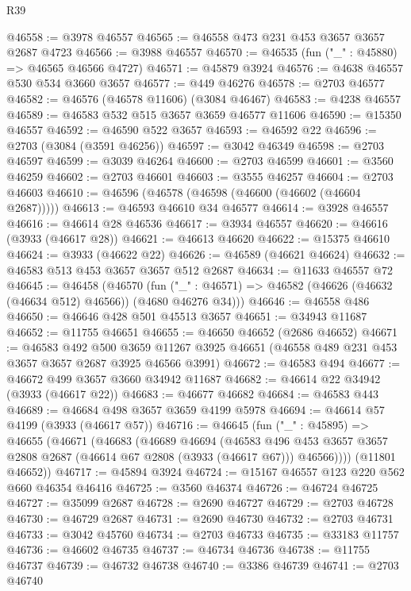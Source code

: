 \begin{lexlean}{R39}
\begin{coremodule}
@46558 := @3978 @46557
@46565 := @46558 @473 @231 @453 @3657 @3657 @2687 @4723
@46566 := @3988 @46557
@46570 := @46535 (fun ("_" : @45880) => @46565 @46566 @4727)
@46571 := @45879 @3924
@46576 := @4638 @46557 @530 @534 @3660 @3657
@46577 := @449 @46276
@46578 := @2703 @46577
@46582 := @46576 (@46578 @11606) (@3084 @46467)
@46583 := @4238 @46557
@46589 := @46583 @532 @515 @3657 @3659 @46577 @11606
@46590 := @15350 @46557
@46592 := @46590 @522 @3657
@46593 := @46592 @22
@46596 := @2703 (@3084 (@3591 @46256))
@46597 := @3042 @46349
@46598 := @2703 @46597
@46599 := @3039 @46264
@46600 := @2703 @46599
@46601 := @3560 @46259
@46602 := @2703 @46601
@46603 := @3555 @46257
@46604 := @2703 @46603
@46610 := @46596 (@46578 (@46598 (@46600 (@46602 (@46604 @2687)))))
@46613 := @46593 @46610 @34 @46577
@46614 := @3928 @46557
@46616 := @46614 @28 @46536
@46617 := @3934 @46557
@46620 := @46616 (@3933 (@46617 @28))
@46621 := @46613 @46620
@46622 := @15375 @46610
@46624 := @3933 (@46622 @22)
@46626 := @46589 (@46621 @46624)
@46632 := @46583 @513 @453 @3657 @3657 @512 @2687
@46634 := @11633 @46557 @72
@46645 := @46458
    (@46570
      (fun ("_" : @46571) => @46582 (@46626 (@46632 (@46634 @512) @46566)) (@4680 @46276 @34)))
@46646 := @46558 @486
@46650 := @46646 @428 @501 @45513 @3657
@46651 := @34943 @11687
@46652 := @11755 @46651
@46655 := @46650 @46652 (@2686 @46652)
@46671 := @46583
    @492
    @500
    @3659
    @11267
    @3925
    @46651
    (@46558 @489 @231 @453 @3657 @3657 @2687 @3925 @46566 @3991)
@46672 := @46583 @494
@46677 := @46672 @499 @3657 @3660 @34942 @11687
@46682 := @46614 @22 @34942 (@3933 (@46617 @22))
@46683 := @46677 @46682
@46684 := @46583 @443
@46689 := @46684 @498 @3657 @3659 @4199 @5978
@46694 := @46614 @57 @4199 (@3933 (@46617 @57))
@46716 := @46645
    (fun ("_" : @45895) =>
    @46655
      (@46671
        (@46683
          (@46689
            @46694
            (@46583
              @496
              @453
              @3657
              @3657
              @2808
              @2687
              (@46614 @67 @2808 (@3933 (@46617 @67)))
              @46566))))
      (@11801 @46652))
@46717 := @45894 @3924
@46724 := @15167 @46557 @123 @220 @562 @660 @46354 @46416
@46725 := @3560 @46374
@46726 := @46724 @46725
@46727 := @35099 @2687
@46728 := @2690 @46727
@46729 := @2703 @46728
@46730 := @46729 @2687
@46731 := @2690 @46730
@46732 := @2703 @46731
@46733 := @3042 @45760
@46734 := @2703 @46733
@46735 := @33183 @11757
@46736 := @46602 @46735
@46737 := @46734 @46736
@46738 := @11755 @46737
@46739 := @46732 @46738
@46740 := @3386 @46739
@46741 := @2703 @46740

\end{coremodule}
\end{lexlean}
